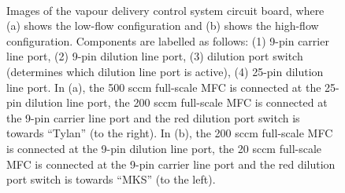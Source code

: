 \documentclass[
  a4paper,
]{scrbook}
\begin{document}
\begin{figure}

\begin{minipage}[t]{0.47\linewidth}

{\centering 


}

\subcaption{\label{fig-low-flow}}
\end{minipage}%
%
\begin{minipage}[t]{0.05\linewidth}

{\centering 

~

}

\end{minipage}%
%
\begin{minipage}[t]{0.47\linewidth}

{\centering 


}

\subcaption{\label{fig-high-flow}}
\end{minipage}%

\caption{\label{fig-vapour-sensor-pcb}Images of the vapour delivery
control system circuit board, where (a) shows the low-flow configuration
and (b) shows the high-flow configuration. Components are labelled as
follows: (1) 9-pin carrier line port, (2) 9-pin dilution line port, (3)
dilution port switch (determines which dilution line port is active),
(4) 25-pin dilution line port. In (a), the 500 sccm full-scale MFC is
connected at the 25-pin dilution line port, the 200 sccm full-scale MFC
is connected at the 9-pin carrier line port and the red dilution port
switch is towards ``Tylan'' (to the right). In (b), the 200 sccm
full-scale MFC is connected at the 9-pin dilution line port, the 20 sccm
full-scale MFC is connected at the 9-pin carrier line port and the red
dilution port switch is towards ``MKS'' (to the left).}

\end{figure}
\end{document}
